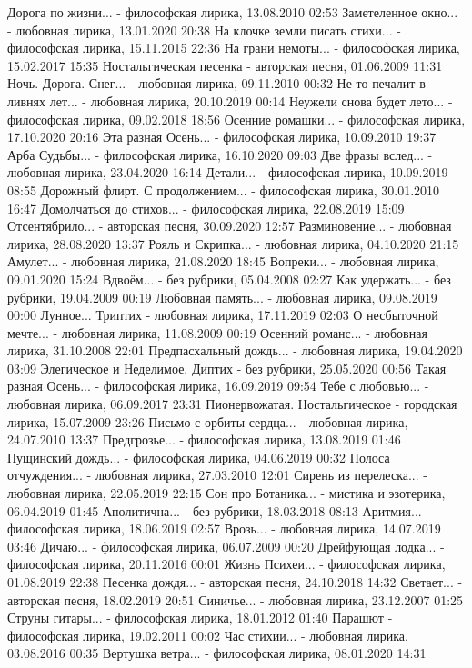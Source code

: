     Дорога по жизни... - философская лирика, 13.08.2010 02:53
    Заметеленное окно... - любовная лирика, 13.01.2020 20:38
    На клочке земли писать стихи... - философская лирика, 15.11.2015 22:36
    На грани немоты... - философская лирика, 15.02.2017 15:35
    Ностальгическая песенка - авторская песня, 01.06.2009 11:31
    Ночь. Дорога. Снег... - любовная лирика, 09.11.2010 00:32
    Не то печалит в ливнях лет... - любовная лирика, 20.10.2019 00:14
    Неужели снова будет лето... - философская лирика, 09.02.2018 18:56
    Осенние ромашки... - философская лирика, 17.10.2020 20:16
    Эта разная Осень... - философская лирика, 10.09.2010 19:37
    Арба Судьбы... - философская лирика, 16.10.2020 09:03
    Две фразы вслед... - любовная лирика, 23.04.2020 16:14
    Детали... - философская лирика, 10.09.2019 08:55
    Дорожный флирт. С продолжением... - философская лирика, 30.01.2010 16:47
    Домолчаться до стихов... - философская лирика, 22.08.2019 15:09
    Отсентябрило... - авторская песня, 30.09.2020 12:57
    Разминовение... - любовная лирика, 28.08.2020 13:37
    Рояль и Скрипка... - любовная лирика, 04.10.2020 21:15
    Амулет... - любовная лирика, 21.08.2020 18:45
    Вопреки... - любовная лирика, 09.01.2020 15:24
    Вдвоём... - без рубрики, 05.04.2008 02:27
    Как удержать... - без рубрики, 19.04.2009 00:19
    Любовная память... - любовная лирика, 09.08.2019 00:00
    Лунное... Триптих - любовная лирика, 17.11.2019 02:03
    О несбыточной мечте... - любовная лирика, 11.08.2009 00:19
    Осенний романс... - любовная лирика, 31.10.2008 22:01
    Предпасхальный дождь... - любовная лирика, 19.04.2020 03:09
    Элегическое и Неделимое. Диптих - без рубрики, 25.05.2020 00:56
    Такая разная Осень... - философская лирика, 16.09.2019 09:54
    Тебе с любовью... - любовная лирика, 06.09.2017 23:31
    Пионервожатая. Ностальгическое - городская лирика, 15.07.2009 23:26
    Письмо с орбиты сердца... - любовная лирика, 24.07.2010 13:37
    Предгрозье... - философская лирика, 13.08.2019 01:46
    Пущинский дождь... - философская лирика, 04.06.2019 00:32
    Полоса отчуждения... - любовная лирика, 27.03.2010 12:01
    Сирень из перелеска... - любовная лирика, 22.05.2019 22:15
    Сон про Ботаника... - мистика и эзотерика, 06.04.2019 01:45
    Аполитична... - без рубрики, 18.03.2018 08:13
    Аритмия... - философская лирика, 18.06.2019 02:57
    Врозь... - любовная лирика, 14.07.2019 03:46
    Дичаю... - философская лирика, 06.07.2009 00:20
    Дрейфующая лодка... - философская лирика, 20.11.2016 00:01
    Жизнь Психеи... - философская лирика, 01.08.2019 22:38
    Песенка дождя... - авторская песня, 24.10.2018 14:32
    Светает... - авторская песня, 18.02.2019 20:51
    Синичье... - любовная лирика, 23.12.2007 01:25
    Струны гитары... - философская лирика, 18.01.2012 01:40
    Парашют - философская лирика, 19.02.2011 00:02
    Час стихии... - любовная лирика, 03.08.2016 00:35
    Вертушка ветра... - философская лирика, 08.01.2020 14:31

